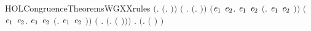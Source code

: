 \newcommand{\HOLCongruenceTheoremsWGXXind}{\UseVerbatim{HOLCongruenceTheoremsWGXXind}}
\begin{SaveVerbatim}{HOLCongruenceTheoremsWGXXrules}
\HOLTokenTurnstile{} \ensuremath{(}\HOLSymConst{\HOLTokenForall{}}.  \ensuremath{(}\HOLTokenLambda{}. \ensuremath{)}\ensuremath{)} \HOLSymConst{\HOLTokenConj{}} \ensuremath{(}\HOLSymConst{\HOLTokenForall{}} .   \HOLSymConst{\HOLTokenImp{}}  \ensuremath{(}\HOLTokenLambda{}. \HOLSymConst{\ensuremath{\ldotp}} \ensuremath{)}\ensuremath{)} \HOLSymConst{\HOLTokenConj{}}
   \ensuremath{(}\HOLSymConst{\HOLTokenForall{}}\ensuremath{\HOLBoundVar{e}\sb{\mathrm{1}}} \ensuremath{\HOLBoundVar{e}\sb{\mathrm{2}}}.  \ensuremath{\HOLBoundVar{e}\sb{\mathrm{1}}} \HOLSymConst{\HOLTokenConj{}}  \ensuremath{\HOLBoundVar{e}\sb{\mathrm{2}}} \HOLSymConst{\HOLTokenImp{}}  \ensuremath{(}\HOLTokenLambda{}. \ensuremath{\HOLBoundVar{e}\sb{\mathrm{1}}}  \HOLSymConst{\ensuremath{+}} \ensuremath{\HOLBoundVar{e}\sb{\mathrm{2}}} \ensuremath{)}\ensuremath{)} \HOLSymConst{\HOLTokenConj{}}
   \ensuremath{(}\HOLSymConst{\HOLTokenForall{}}\ensuremath{\HOLBoundVar{e}\sb{\mathrm{1}}} \ensuremath{\HOLBoundVar{e}\sb{\mathrm{2}}}.  \ensuremath{\HOLBoundVar{e}\sb{\mathrm{1}}} \HOLSymConst{\HOLTokenConj{}}  \ensuremath{\HOLBoundVar{e}\sb{\mathrm{2}}} \HOLSymConst{\HOLTokenImp{}}  \ensuremath{(}\HOLTokenLambda{}. \ensuremath{\HOLBoundVar{e}\sb{\mathrm{1}}}  \HOLSymConst{\ensuremath{\mid}} \ensuremath{\HOLBoundVar{e}\sb{\mathrm{2}}} \ensuremath{)}\ensuremath{)} \HOLSymConst{\HOLTokenConj{}}
   \ensuremath{(}\HOLSymConst{\HOLTokenForall{}} .   \HOLSymConst{\HOLTokenImp{}}  \ensuremath{(}\HOLTokenLambda{}.   \ensuremath{(} \ensuremath{)}\ensuremath{)}\ensuremath{)} \HOLSymConst{\HOLTokenConj{}}
   \HOLSymConst{\HOLTokenForall{}} .   \HOLSymConst{\HOLTokenImp{}}  \ensuremath{(}\HOLTokenLambda{}.  \ensuremath{(} \ensuremath{)} \ensuremath{)}
\end{SaveVerbatim}
